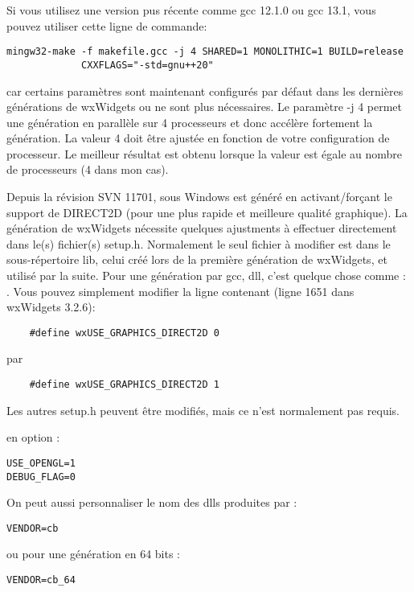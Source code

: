 Si vous utilisez une version pus récente comme gcc 12.1.0 ou gcc 13.1, vous pouvez utiliser cette ligne de commande:
\begin{verbatim}
mingw32-make -f makefile.gcc -j 4 SHARED=1 MONOLITHIC=1 BUILD=release
             CXXFLAGS="-std=gnu++20"
\end{verbatim}
car certains paramètres sont maintenant configurés par défaut dans les dernières générations de wxWidgets ou ne sont plus nécessaires.\newline
Le paramètre -j 4 permet une génération en parallèle sur 4 processeurs et donc accélère fortement la génération. La valeur 4 doit être ajustée en fonction de votre configuration de processeur.
Le meilleur résultat est obtenu lorsque la valeur est égale au nombre de processeurs (4 dans mon cas).

Depuis la révision SVN 11701, \codeblocks sous Windows est généré en activant/forçant le support de DIRECT2D (pour une plus rapide et meilleure qualité graphique). La génération de wxWidgets nécessite quelques ajustments à effectuer directement dans le(s) fichier(s) setup.h. Normalement le seul fichier à modifier est dans le sous-répertoire lib, celui créé lors de la première génération de wxWidgets, et utilisé par la suite. Pour une génération par gcc, dll, c'est quelque chose comme :\newline
{}.\newline
Vous pouvez simplement modifier la ligne contenant (ligne 1651 dans wxWidgets 3.2.6):
\begin{verbatim}
    #define wxUSE_GRAPHICS_DIRECT2D 0 
\end{verbatim}
par
\begin{verbatim}
    #define wxUSE_GRAPHICS_DIRECT2D 1  
\end{verbatim}
Les autres setup.h peuvent être modifiés, mais ce n'est normalement pas requis.

en option :
\begin{verbatim}
USE_OPENGL=1
DEBUG_FLAG=0
\end{verbatim}


On peut aussi personnaliser le nom des dlls produites par :
\begin{verbatim}
VENDOR=cb
\end{verbatim}
ou pour une génération en 64 bits :
\begin{verbatim}
VENDOR=cb_64
\end{verbatim}

